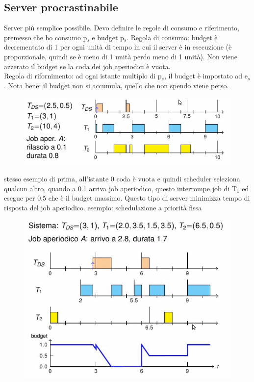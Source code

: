 \documentclass[12pt, oneside]{extbook}
\begin{document}
\subsection{Server procrastinabile}
Server più semplice possibile. Devo definire le regole di consumo e riferimento, premesso che ho consumo p$_{s}$ e budget p$_{s}$. Regola di consumo: budget è decrementato di 1 per ogni unità di tempo in cui il server è in esecuzione (è proporzionale, quindi se è meno di 1 unità perdo meno di 1 unità). Non viene azzerato il budget se la coda dei job aperiodici è vuota.\\ Regola di rifornimento: ad ogni istante multiplo di p$_{s}$, il budget è impostato ad e$_{s}$. Nota bene: il budget non si accumula, quello che non spendo viene perso.\\
\begin{figure}[!h]
\centering
\includegraphics[scale=0.4]{immagini/image-013.jpg}
\end{figure}
stesso esempio di prima, all'istante 0 coda è vuota e quindi scheduler seleziona qualcun altro, quando a 0.1 arriva job aperiodico, questo interrompe job di T$_{1}$ ed esegue per 0.5 che è il budget massimo. Questo tipo di server minimizza tempo di risposta del job aperiodico. esempio: schedulazione a priorità fissa\\
\begin{figure}[!h]
\centering
\includegraphics[scale=0.4]{immagini/image-014.jpg}
\end{figure}
\end{document}
